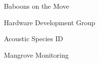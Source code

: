 \item Baboons on the Move
\item Hardware Development Group
\item Acoustic Species ID
\item Mangrove Monitoring
